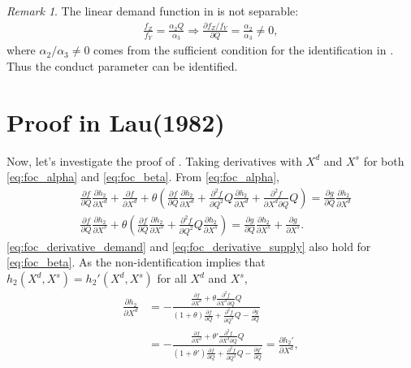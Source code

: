 \documentclass[11pt, a4paper]{article}
\theoremstyle{remark}
\newtheorem{remark}{Remark}
\begin{document}
\begin{remark}
    The linear demand function in \citet{bresnahan1982oligopoly} is not separable:
    \begin{align}
        \frac{f_Z}{f_Y} = \frac{\alpha_2 Q}{\alpha_3} \Longrightarrow \frac{\partial f_Z/f_Y}{\partial Q} = \frac{\alpha_2}{\alpha_3} \ne 0,
    \end{align}
    where $\alpha_2/\alpha_3 \ne 0$ comes from the sufficient condition for the identification in \citet{matsumura2023resolving}.
    Thus the conduct parameter can be identified.
\end{remark}



\section{Proof in Lau(1982)}\label{sec:proof_lau}
Now, let's investigate the proof of \citet{lau1982identifying}.
Taking derivatives with $X^{d}$ and $X^{s}$ for both \eqref{eq:foc_alpha}
and \eqref{eq:foc_beta}.
From \eqref{eq:foc_alpha},
\begin{align}
    & \frac{\partial f}{\partial Q}\frac{\partial h_2}{\partial X^{d}} + \frac{\partial f}{\partial X^{d}} + \theta\left(\frac{\partial f}{\partial Q}\frac{\partial h_2}{\partial X^{d}}  + \frac{\partial^2 f}{\partial Q^2}Q\frac{\partial h_2}{\partial X^{d}} + \frac{\partial^2 f}{\partial X^{d}\partial Q}Q \right) = \frac{\partial g}{\partial Q}\frac{\partial h_2}{\partial X^{d}}\label{eq:foc_derivative_demand}\\
    & \frac{\partial f}{\partial Q}\frac{\partial h_2}{\partial X^{s}} + \theta \left(\frac{\partial f}{\partial Q}\frac{\partial h_2}{\partial X^{s}}  + \frac{\partial^2 f}{\partial Q^2}Q\frac{\partial h_2}{\partial X^{s}} \right) =  \frac{\partial g}{\partial Q}\frac{\partial h_2}{\partial X^{s}} + \frac{\partial g}{\partial X^{s}}\label{eq:foc_derivative_supply}.
\end{align}
\eqref{eq:foc_derivative_demand} and \eqref{eq:foc_derivative_supply} also hold for \eqref{eq:foc_beta}.
As the non-identification implies that $h_2(X^{d}, X^{s}) = h_2'(X^{d}, X^{s})$ for all $X^{d}$ and $X^{s}$,
\begin{align}
    \frac{\partial h_2}{\partial X^{d}} & = - \frac{\frac{\partial f}{\partial X^{d}} + \theta \frac{\partial^2 f}{\partial X^{d}\partial Q}Q }{(1+\theta)\frac{\partial f}{\partial Q} + \frac{\partial^2 f}{\partial Q^2}Q - \frac{\partial g}{\partial Q}}\\
    & = - \frac{\frac{\partial f}{\partial X^{d}} + \theta' \frac{\partial^2 f}{\partial X^{d}\partial Q}Q }{(1+\theta')\frac{\partial f}{\partial Q} + \frac{\partial^2 f}{\partial Q^2}Q - \frac{\partial g'}{\partial Q}}= \frac{\partial h_2'}{\partial X^{d}},
\end{align}
\end{document}
